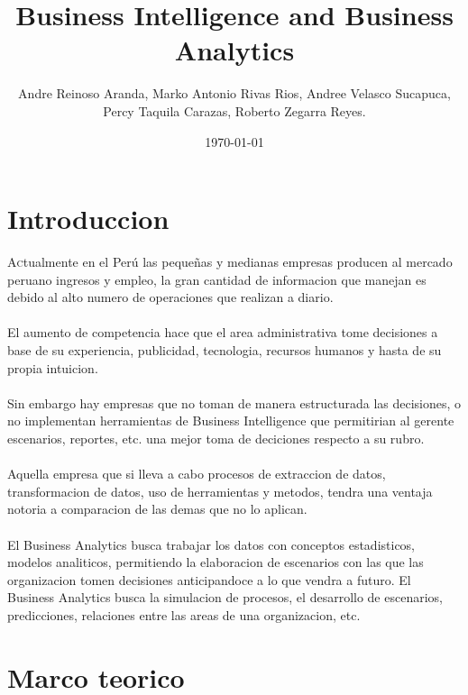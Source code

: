 \documentclass[twoside,twocolumn]{article}
\title{Business Intelligence and Business Analytics}
\author{Andre Reinoso Aranda, Marko Antonio Rivas Rios, Andree Velasco Sucapuca, \\
Percy Taquila Carazas, Roberto Zegarra Reyes. }
\date{\today}
\begin{document}
\maketitle


\section{Introduccion}
\lettrine[nindent=0em,lines=3]{A}ctualmente en el Perú las pequeñas y medianas empresas producen al mercado peruano ingresos y empleo, la gran cantidad de informacion que manejan es debido al alto numero de operaciones que realizan a diario.\\ \\
El aumento de competencia hace que el area administrativa tome decisiones a base de su experiencia, publicidad, tecnologia, recursos humanos y hasta de su propia intuicion.\\ \\
Sin embargo hay empresas que no toman de manera estructurada las decisiones, o no implementan herramientas de Business Intelligence que permitirian al gerente escenarios, reportes, etc. una mejor toma de deciciones respecto a su rubro. \\ \\
Aquella empresa que si lleva a cabo procesos de extraccion de datos, transformacion de datos, uso de herramientas y metodos, tendra una ventaja notoria a comparacion de las demas que no lo aplican.
\\ \\
El Business Analytics busca trabajar los datos con conceptos estadisticos, modelos analiticos, permitiendo la elaboracion de escenarios con las que las organizacion tomen decisiones anticipandoce a lo que vendra a futuro. El Business Analytics busca la simulacion de procesos, el desarrollo de escenarios, predicciones, relaciones entre las areas de una organizacion, etc.


\section{Marco teorico}
\end{document}
